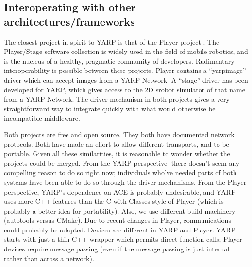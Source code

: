 







\subsection{Interoperating with other architectures/frameworks}

The closest project in spirit to YARP is that of the Player project
\cite{vaughan2006reusable}.  The Player/Stage software collection is 
widely used in the field of mobile robotics, and is the nucleus of
a healthy, pragmatic community of developers.  
%
Rudimentary interoperability is possible between these projects.
Player contains a ``yarpimage'' driver which can accept images
from a YARP Network.  A ``stage'' driver has been developed
for YARP, which gives access to the 2D srobot simulator of that
name from a YARP Network.
%
The driver mechanism in both projects gives a very straightforward way
to integrate quickly with what would otherwise be incompatible
middleware.

Both projects are free and open source.  They both have documented
network protocols.  Both have made an effort to allow different
transports, and to be portable.  Given all these similarities,
it is reasonable to wonder whether the projects could be merged.
%
From the YARP perspective, there doesn't seem any compelling reason to
do so right now; individuals who've needed parts of both systems have
been able to do so through the driver mechanisms.
%
From the Player perspective, YARP's dependence on ACE is probably
undesirable, and YARP uses more C++ features than the C-with-Classes
style of Player (which is probably a better idea for portability).
Also, we use different build machinery (autotools versus CMake).
%
Due to recent changes in Player, communications could probably be
adapted.  Devices are different in YARP and Player.  YARP starts
with just a thin C++ wrapper which permits direct function calls;
Player devices require message passing (even if the message passing
is just internal rather than across a network).








